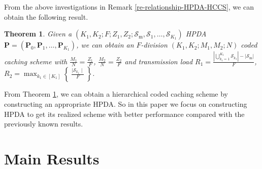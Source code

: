 \documentclass[onecolumn,10pt]{IEEEtran}
\theoremstyle{mythm}
\newtheorem{theorem}{Theorem}
\begin{document}











From the above investigations in Remark \ref{re-relationship-HPDA-HCCS}, we can obtain the following result.
\begin{theorem}
\label{th-main-result}
Given a $(K_1,K_2;F;Z_1,Z_2;\mathcal{S}_\text{m},\mathcal{S}_1,\ldots,\mathcal{S}_{K_1}) $ HPDA $\mathbf{P}=(\mathbf{P}_0,\mathbf{P}_1,\ldots,\mathbf{P}_{K_1})$,   we can obtain an $F$-division $(K_1,K_2;M_1,M_2;N)$ coded caching scheme with $\frac{M_1}{N}=\frac{Z_1}{F}$, $\frac{M_2}{N}=\frac{Z_2}{F}$ and transmission load $R_1=\frac{|\bigcup_{k_1=1}^{K_1}\mathcal{S}_{k_1}|-|\mathcal{S}_\text{m}|}{F}$, $R_2=\max_{k_1\in[K_1]}\left\{\  \frac{\mid\mathcal{S}_{k_1}\mid}{F}\ \right\}$.
\end{theorem}
From Theorem \ref{th-main-result}, we can obtain a hierarchical coded caching scheme by constructing an appropriate HPDA. So in this paper we focus on constructing HPDA to get its realized scheme with better performance compared with the previously known results.

\section{Main Results}
\label{sec:RESULT}
\end{document}
